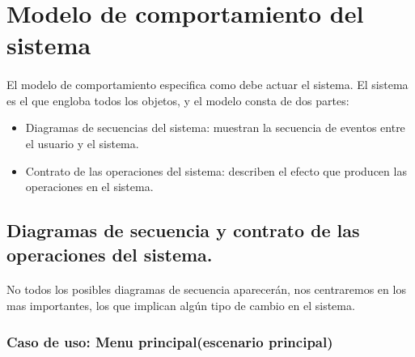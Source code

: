 \section{Modelo de comportamiento del sistema}

\paragraph{}
El modelo de comportamiento especifica como debe actuar el sistema. El sistema es el que engloba todos los objetos, y el modelo
consta de dos partes:

\begin{itemize}
    \item Diagramas de secuencias del sistema: muestran la secuencia de eventos entre el usuario y el sistema.
    \item Contrato de las operaciones del sistema: describen el efecto que producen las operaciones en el sistema.
\end{itemize}

\subsection{Diagramas de secuencia y contrato de las operaciones del sistema.}

\paragraph{}
No todos los posibles diagramas de secuencia aparecerán, nos centraremos en los mas importantes, los que implican algún tipo de 
cambio en el sistema.

\subsubsection{Caso de uso: Menu principal(escenario principal)}

